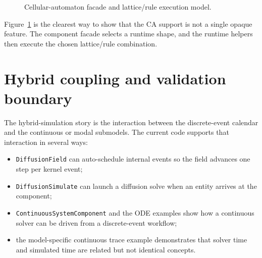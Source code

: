 \begin{figure}[htbp]
\centering
\caption{Cellular-automaton facade and lattice/rule execution model.}
\label{fig:cellular-automaton-lattice}
\end{figure}

Figure~\ref{fig:cellular-automaton-lattice} is the clearest way to show that
the CA support is not a single opaque feature. The component facade selects a
runtime shape, and the runtime helpers then execute the chosen lattice/rule
combination.

\section{Hybrid coupling and validation boundary}
\label{sec:hybrid-coupling-and-validation}

The hybrid-simulation story is the interaction between the discrete-event
calendar and the continuous or modal submodels. The current code supports that
interaction in several ways:
\begin{itemize}
\item \texttt{DiffusionField} can auto-schedule internal events so the field
  advances one step per kernel event;
\item \texttt{DiffusionSimulate} can launch a diffusion solve when an entity
  arrives at the component;
\item \texttt{ContinuousSystemComponent} and the ODE examples show how a
  continuous solver can be driven from a discrete-event workflow;
\item the model-specific continuous trace example demonstrates that solver time
  and simulated time are related but not identical concepts.
\end{itemize}

